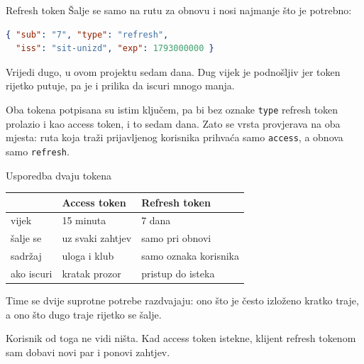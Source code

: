 \begin{frame}[fragile]{Refresh token}
Šalje se samo na rutu za obnovu i nosi najmanje što je potrebno:

\begin{lstlisting}[language=json]
{ "sub": "7", "type": "refresh",
  "iss": "sit-unizd", "exp": 1793000000 }
\end{lstlisting}

\vspace{0.4em}
Vrijedi dugo, u ovom projektu sedam dana. Dug vijek je podnošljiv jer token rijetko putuje, pa je i prilika da iscuri mnogo manja.

\vspace{1.1em}
Oba tokena potpisana su istim ključem, pa bi bez oznake \texttt{type} refresh token prolazio i kao access token, i to sedam dana. Zato se vrsta provjerava na oba mjesta: ruta koja traži prijavljenog korisnika prihvaća samo \texttt{access}, a obnova samo \texttt{refresh}.
\end{frame}

\begin{frame}{Usporedba dvaju tokena}
\begin{center}
{\small
\setlength{\tabcolsep}{8pt}
\renewcommand{\arraystretch}{1.35}
\begin{tabular}{@{}lll@{}}
  \toprule
   & \textbf{Access token} & \textbf{Refresh token} \\
  \midrule
  vijek        & 15 minuta            & 7 dana \\
  šalje se     & uz svaki zahtjev     & samo pri obnovi \\
  sadržaj      & uloga i klub         & samo oznaka korisnika \\
  ako iscuri   & kratak prozor        & pristup do isteka \\
  \bottomrule
\end{tabular}
}
\end{center}

\vspace{0.6em}
Time se dvije suprotne potrebe razdvajaju: ono što je često izloženo kratko traje, a ono što dugo traje rijetko se šalje.

\vspace{1.1em}
Korisnik od toga ne vidi ništa. Kad access token istekne, klijent refresh tokenom sam dobavi novi par i ponovi zahtjev.
\end{frame}


